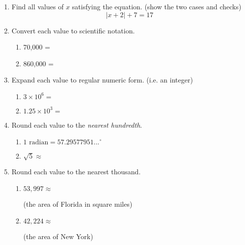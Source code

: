 \begin{enumerate}
\item Find all values of $x$ satisfying the equation. (show the two cases and checks) 
  $$ |x+2|+7 = 17$$

\item Convert each value to scientific notation.
  \begin{multicols}{2}
    \begin{enumerate}[itemsep=1cm]
      \item 70,000 =
      \item 860,000 =
    \end{enumerate}
  \end{multicols} \vspace{1cm}

\item Expand each value to regular numeric form. (i.e. an integer)
  \begin{multicols}{2}
    \begin{enumerate}[itemsep=1cm]
      \item $3 \times 10^{6}=$
      \item $1.25 \times 10^{3}=$
    \end{enumerate}
  \end{multicols} \vspace{0.7cm}

\item Round each value to the \emph{nearest hundredth}.
  \begin{multicols}{2}
    \begin{enumerate}
      \item $1 \text{ radian}=57.29577951...^\circ$ \par 
      \item $\sqrt{5} \approx$
    \end{enumerate}
  \end{multicols} \smallskip 

\item Round each value to the nearest thousand.
  \begin{multicols}{2}
    \begin{enumerate}
      \item $53,997 \approx$ \par \bigskip (the area of Florida in square miles)
      \item $42,224 \approx$ \par \bigskip (the area of New York)
    \end{enumerate}
  \end{multicols}


\end{enumerate}
